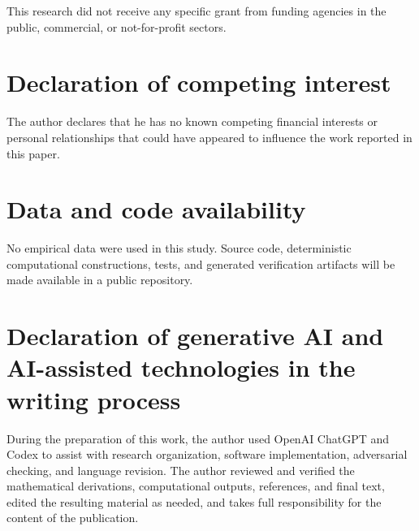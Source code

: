 \documentclass[a4paper,fleqn]{cas-dc}
\begin{document}
This research did not receive any specific grant from funding agencies
in the public, commercial, or not-for-profit sectors.

\section*{Declaration of competing interest}

The author declares that he has no known competing financial interests
or personal relationships that could have appeared to influence the
work reported in this paper.

\section*{Data and code availability}

No empirical data were used in this study. Source code, deterministic
computational constructions, tests, and generated verification artifacts
will be made available in a public repository.

\section*{
Declaration of generative AI and AI-assisted technologies in the
writing process
}

During the preparation of this work, the author used OpenAI ChatGPT and
Codex to assist with research organization, software implementation,
adversarial checking, and language revision. The author reviewed and
verified the mathematical derivations, computational outputs,
references, and final text, edited the resulting material as needed,
and takes full responsibility for the content of the publication.




\end{document}
